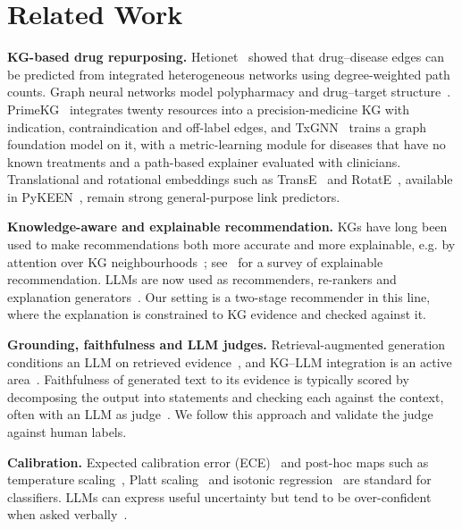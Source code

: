 \documentclass[electronics,article,submit]{Definitions/mdpi}
\begin{document}
\section{Related Work}
\textbf{KG-based drug repurposing.} Hetionet~\cite{himmelstein2017hetionet} showed that drug--disease edges can be predicted from integrated heterogeneous networks using degree-weighted path counts. Graph neural networks model polypharmacy and drug--target structure~\cite{zitnik2018decagon}. PrimeKG~\cite{chandak2023primekg} integrates twenty resources into a precision-medicine KG with indication, contraindication and off-label edges, and TxGNN~\cite{huang2024txgnn} trains a graph foundation model on it, with a metric-learning module for diseases that have no known treatments and a path-based explainer evaluated with clinicians. Translational and rotational embeddings such as TransE~\cite{bordes2013transe} and RotatE~\cite{sun2019rotate}, available in PyKEEN~\cite{ali2021pykeen}, remain strong general-purpose link predictors.

\textbf{Knowledge-aware and explainable recommendation.} KGs have long been used to make recommendations both more accurate and more explainable, e.g. by attention over KG neighbourhoods~\cite{wang2019kgat}; see~\cite{zhang2020explainable} for a survey of explainable recommendation. LLMs are now used as recommenders, re-rankers and explanation generators~\cite{wu2024llmrec}. Our setting is a two-stage recommender in this line, where the explanation is constrained to KG evidence and checked against it.

\textbf{Grounding, faithfulness and LLM judges.} Retrieval-augmented generation conditions an LLM on retrieved evidence~\cite{lewis2020rag}, and KG--LLM integration is an active area~\cite{pan2024unifying}. Faithfulness of generated text to its evidence is typically scored by decomposing the output into statements and checking each against the context, often with an LLM as judge~\cite{es2024ragas,zheng2023judge}. We follow this approach and validate the judge against human labels.

\textbf{Calibration.} Expected calibration error (ECE)~\cite{naeini2015ece} and post-hoc maps such as temperature scaling~\cite{guo2017calibration}, Platt scaling~\cite{platt1999} and isotonic regression~\cite{zadrozny2002} are standard for classifiers. LLMs can express useful uncertainty but tend to be over-confident when asked verbally~\cite{kadavath2022know,xiong2024uncertainty}.
\end{document}
